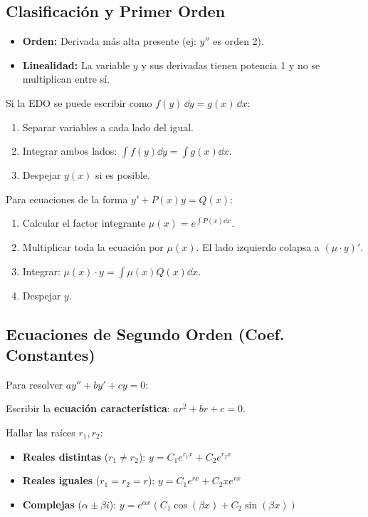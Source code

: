 \subsection{Clasificación y Primer Orden}

\begin{definicion}[title=Conceptos Básicos]
\begin{itemize}
    \item \textbf{Orden:} Derivada más alta presente (ej: $y''$ es orden 2).
    \item \textbf{Linealidad:} La variable $y$ y sus derivadas tienen potencia 1 y no se multiplican entre sí.
\end{itemize}
\end{definicion}

\begin{teorema}[title=Método: Variables Separables]
Si la EDO se puede escribir como $f(y) \, \dd y = g(x) \, \dd x$:
\begin{enumerate}
    \item Separar variables a cada lado del igual.
    \item Integrar ambos lados: $\int f(y) \dd y = \int g(x) \dd x$.
    \item Despejar $y(x)$ si es posible.
\end{enumerate}
\end{teorema}

\begin{teorema}[title=Método: Factor Integrante (Ec. Lineales 1er Orden)]
Para ecuaciones de la forma $y' + P(x)y = Q(x)$:
\begin{enumerate}
    \item Calcular el factor integrante $\mu(x) = e^{\int P(x) \dd x}$.
    \item Multiplicar toda la ecuación por $\mu(x)$. El lado izquierdo colapsa a $(\mu \cdot y)'$.
    \item Integrar: $\mu(x) \cdot y = \int \mu(x) Q(x) \dd x$.
    \item Despejar $y$.
\end{enumerate}
\end{teorema}

\subsection{Ecuaciones de Segundo Orden (Coef. Constantes)}

Para resolver $ay'' + by' + cy = 0$:
\begin{pasos}
\item Escribir la \textbf{ecuación característica}: $ar^2 + br + c = 0$.
\item Hallar las raíces $r_1, r_2$:
\begin{itemize}
    \item \textbf{Reales distintas} ($r_1 \ne r_2$): $y = C_1 e^{r_1 x} + C_2 e^{r_2 x}$
    \item \textbf{Reales iguales} ($r_1 = r_2 = r$): $y = C_1 e^{rx} + C_2 x e^{rx}$
    \item \textbf{Complejas} ($\alpha \pm \beta i$): $y = e^{\alpha x}(C_1 \cos(\beta x) + C_2 \sin(\beta x))$
\end{itemize}
\end{pasos}

